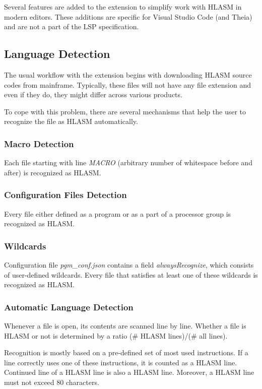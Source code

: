 Several features are added to the extension to simplify work with HLASM in modern editors. These additions are specific for Visual Studio Code (and Theia) and are not a part of the LSP specification.

\subsection{Language Detection}

The usual workflow with the extension begins with downloading HLASM source codes from mainframe. Typically, these files will not have any file extension and even if they do, they might differ across various products.

To cope with this problem, there are several mechanisms that help the user to recognize the file as HLASM automatically.

\subsubsection{Macro Detection}

Each file starting with line \emph{MACRO} (arbitrary number of whitespace before and after) is recognized as HLASM.

\subsubsection{Configuration Files Detection}

Every file either defined as a program or as a part of a processor group is recognized as HLASM.

\subsubsection{Wildcards}

Configuration file \emph{pgm\_conf.json} contains a field \emph{alwaysRecognize}, which consists of user-defined wildcards. Every file that satisfies at least one of these wildcards is recognized as HLASM.

\subsubsection{Automatic Language Detection}

Whenever a file is open, its contents are scanned line by line. Whether a file is HLASM or not is determined by a ratio (\# HLASM lines)/(\# all lines).

Recognition is mostly based on a pre-defined set of most used instructions. If a line correctly uses one of these instructions, it is counted as a HLASM line. Continued line of a HLASM line is also a HLASM line.
Moreover, a HLASM line must not exceed 80 characters.

